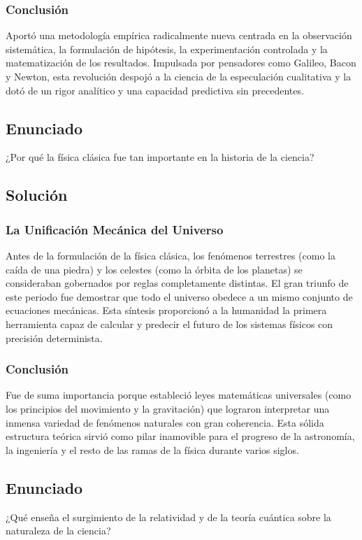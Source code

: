 \documentclass[12pt, a4paper]{article}
\begin{document}
\subsubsection*{Conclusión}
Aportó una metodología empírica radicalmente nueva centrada en la observación sistemática, la formulación de hipótesis, la experimentación controlada y la matematización de los resultados. Impulsada por pensadores como Galileo, Bacon y Newton, esta revolución despojó a la ciencia de la especulación cualitativa y la dotó de un rigor analítico y una capacidad predictiva sin precedentes.

\newpage

\subsection*{Enunciado}
¿Por qué la física clásica fue tan importante en la historia de la ciencia?

\subsection*{Solución}

\subsubsection*{La Unificación Mecánica del Universo}
Antes de la formulación de la física clásica, los fenómenos terrestres (como la caída de una piedra) y los celestes (como la órbita de los planetas) se consideraban gobernados por reglas completamente distintas. El gran triunfo de este periodo fue demostrar que todo el universo obedece a un mismo conjunto de ecuaciones mecánicas. Esta síntesis proporcionó a la humanidad la primera herramienta capaz de calcular y predecir el futuro de los sistemas físicos con precisión determinista.

\subsubsection*{Conclusión}
Fue de suma importancia porque estableció leyes matemáticas universales (como los principios del movimiento y la gravitación) que lograron interpretar una inmensa variedad de fenómenos naturales con gran coherencia. Esta sólida estructura teórica sirvió como pilar inamovible para el progreso de la astronomía, la ingeniería y el resto de las ramas de la física durante varios siglos.

\newpage

\subsection*{Enunciado}
¿Qué enseña el surgimiento de la relatividad y de la teoría cuántica sobre la naturaleza de la ciencia?
\end{document}

